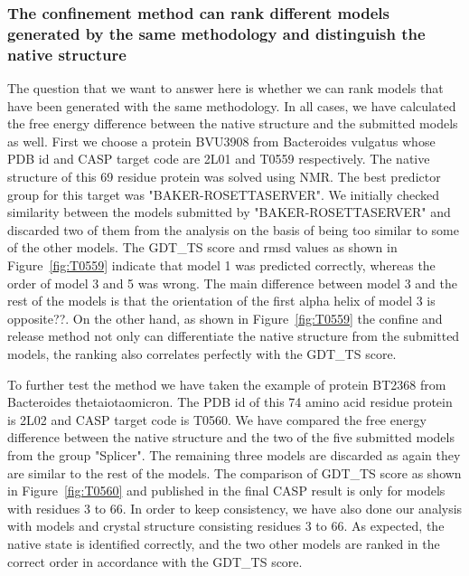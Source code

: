 \documentclass[12pt]{article}
\newcommand{\Alberto}[1]{\color{ForestGreen}#1\normalcolor }
\begin{document}
\subsubsection{The confinement method can rank different models generated by the same methodology and distinguish the native structure}

The question that we want to answer here is whether we can rank models that have been generated with
the same methodology. In all cases, we have calculated the free energy
difference between the native structure and the submitted models as well. 
First we choose a protein BVU3908 from Bacteroides vulgatus whose PDB id and CASP target code are
2L01 and T0559 respectively. The native structure of this 69 residue protein was solved using NMR.
The best predictor group for this target was "BAKER-ROSETTASERVER".
We initially checked similarity between the models submitted by "BAKER-ROSETTASERVER" and discarded two of them from the 
analysis on the basis of being too similar to some of the other models. The GDT\_TS score and rmsd
values as shown in Figure~\ref{fig:T0559} indicate that model 1 was predicted correctly, 
whereas the order of model 3 and 5 was wrong. The main difference
between model 3 and the rest of the models is that the orientation of the first alpha helix of model
3 is \Alberto{opposite??}.
On the other hand, as shown in Figure~\ref{fig:T0559} the confine and release method not only can differentiate the native 
structure from the submitted models, the ranking also correlates perfectly with the GDT\_TS score.  

To further test the method we have taken the example of protein BT2368 from Bacteroides thetaiotaomicron. The PDB id of this 
74 amino acid residue protein is 2L02 and CASP target code is T0560. We have compared the free energy difference between 
the native structure and the two of the five submitted models from the group "Splicer". The remaining three models are discarded as 
again they are similar to the rest of the models. The comparison of GDT\_TS score as shown in 
Figure~\ref{fig:T0560} and published in the final CASP result is only for models with residues 3 to 66. In order to keep
consistency, we have also done our analysis with models and crystal structure consisting residues 3 to 66. As expected,
the native state is identified correctly, and the two other models are ranked in the correct order in accordance with the GDT\_TS score.   
\end{document}
